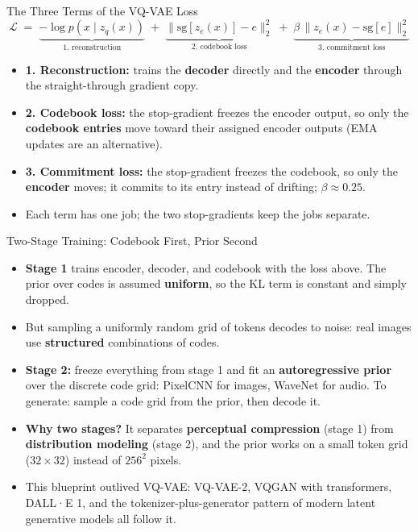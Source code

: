 \begin{frame}{The Three Terms of the VQ-VAE Loss}
\[
\mathcal{L} \;=\; \underbrace{-\log p(x \mid z_q(x))}_{\text{1. reconstruction}} \;+\; \underbrace{\|\mathrm{sg}[z_e(x)] - e\|_2^2}_{\text{2. codebook loss}} \;+\; \underbrace{\beta \, \|z_e(x) - \mathrm{sg}[e]\|_2^2}_{\text{3. commitment loss}}
\]
\begin{itemize}
    \item \textbf{1. Reconstruction:} trains the \textbf{decoder} directly and the \textbf{encoder} through the straight-through gradient copy.
    \item \textbf{2. Codebook loss:} the stop-gradient freezes the encoder output, so only the \textbf{codebook entries} move toward their assigned encoder outputs (EMA updates are an alternative).
    \item \textbf{3. Commitment loss:} the stop-gradient freezes the codebook, so only the \textbf{encoder} moves; it commits to its entry instead of drifting; $\beta \approx 0.25$.
    \item Each term has one job; the two stop-gradients keep the jobs separate.
\end{itemize}
\end{frame}

\begin{frame}{Two-Stage Training: Codebook First, Prior Second}
\begin{itemize}
    \item \textbf{Stage 1} trains encoder, decoder, and codebook with the loss above. The prior over codes is assumed \textbf{uniform}, so the KL term is constant and simply dropped.
    \item But sampling a uniformly random grid of tokens decodes to noise: real images use \textbf{structured} combinations of codes.
    \item \textbf{Stage 2:} freeze everything from stage 1 and fit an \textbf{autoregressive prior} over the discrete code grid: PixelCNN for images, WaveNet for audio. To generate: sample a code grid from the prior, then decode it.
    \item \textbf{Why two stages?} It separates \textbf{perceptual compression} (stage 1) from \textbf{distribution modeling} (stage 2), and the prior works on a small token grid ($32 \times 32$) instead of $256^2$ pixels.
    \item This blueprint outlived VQ-VAE: VQ-VAE-2, VQGAN with transformers, DALL·E 1, and the tokenizer-plus-generator pattern of modern latent generative models all follow it.
\end{itemize}
\end{frame}

